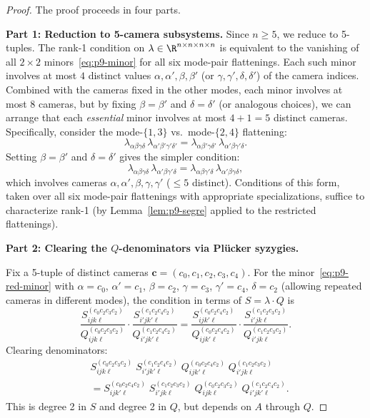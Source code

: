 \begin{proof}
The proof proceeds in four parts.

\medskip
\textbf{Part 1: Reduction to 5-camera subsystems.}
Since $n\geq 5$, we reduce to 5-tuples. The rank-1 condition on
$\lambda\in\R^{n\times n\times n\times n}$ is equivalent to the vanishing
of all $2\times 2$ minors~\eqref{eq:p9-minor} for all six mode-pair flattenings.
Each such minor involves at most $4$ distinct values
$\alpha,\alpha',\beta,\beta'$ (or $\gamma,\gamma',\delta,\delta'$)
of the camera indices. Combined with the cameras fixed in the other modes,
each minor involves at most $8$ cameras, but by fixing $\beta = \beta'$ and
$\delta = \delta'$ (or analogous choices), we can arrange that
each \emph{essential} minor involves at most $4+1 = 5$ distinct cameras.
Specifically, consider the mode-$\{1,3\}$ vs.\ mode-$\{2,4\}$ flattening:
\[
  \lambda_{\alpha\beta\gamma\delta}\,\lambda_{\alpha'\beta'\gamma'\delta'}
  = \lambda_{\alpha\beta'\gamma\delta'}\,\lambda_{\alpha'\beta\gamma'\delta}.
\]
Setting $\beta=\beta'$ and $\delta=\delta'$ gives the simpler condition:
\begin{equation}\label{eq:p9-red-minor}
  \lambda_{\alpha\beta\gamma\delta}\,\lambda_{\alpha'\beta\gamma'\delta}
  = \lambda_{\alpha\beta\gamma'\delta}\,\lambda_{\alpha'\beta\gamma\delta},
\end{equation}
which involves cameras $\alpha,\alpha',\beta,\gamma,\gamma'$ ($\leq 5$ distinct).
Conditions of this form, taken over all six mode-pair flattenings with
appropriate specializations, suffice to characterize rank-1
(by Lemma~\ref{lem:p9-segre} applied to the restricted flattenings).

\medskip
\textbf{Part 2: Clearing the $Q$-denominators via Pl\"ucker syzygies.}

Fix a 5-tuple of distinct cameras $\mathbf{c} = (c_0,c_1,c_2,c_3,c_4)$.
For the minor~\eqref{eq:p9-red-minor} with $\alpha=c_0$, $\alpha'=c_1$,
$\beta=c_2$, $\gamma=c_3$, $\gamma'=c_4$, $\delta=c_2$ (allowing repeated
cameras in different modes), the condition in terms of $S = \lambda\cdot Q$ is
\begin{equation}\label{eq:p9-Sminor}
  \frac{S^{(c_0 c_2 c_3 c_2)}_{ijk\ell}}{Q^{(c_0 c_2 c_3 c_2)}_{ijk\ell}}
  \cdot
  \frac{S^{(c_1 c_2 c_4 c_2)}_{i'jk'\ell}}{Q^{(c_1 c_2 c_4 c_2)}_{i'jk'\ell}}
  =
  \frac{S^{(c_0 c_2 c_4 c_2)}_{ijk'\ell}}{Q^{(c_0 c_2 c_4 c_2)}_{ijk'\ell}}
  \cdot
  \frac{S^{(c_1 c_2 c_3 c_2)}_{i'jk\ell}}{Q^{(c_1 c_2 c_3 c_2)}_{i'jk\ell}}.
\end{equation}
Clearing denominators:
\begin{align}\label{eq:p9-cleared2}
  &S^{(c_0 c_2 c_3 c_2)}_{ijk\ell}\;S^{(c_1 c_2 c_4 c_2)}_{i'jk'\ell}\;
  Q^{(c_0 c_2 c_4 c_2)}_{ijk'\ell}\;Q^{(c_1 c_2 c_3 c_2)}_{i'jk\ell}\nonumber\\
  &=
  S^{(c_0 c_2 c_4 c_2)}_{ijk'\ell}\;S^{(c_1 c_2 c_3 c_2)}_{i'jk\ell}\;
  Q^{(c_0 c_2 c_3 c_2)}_{ijk\ell}\;Q^{(c_1 c_2 c_4 c_2)}_{i'jk'\ell}.
\end{align}
This is degree 2 in $S$ and degree 2 in $Q$, but depends on $A$ through $Q$.


\end{proof}
